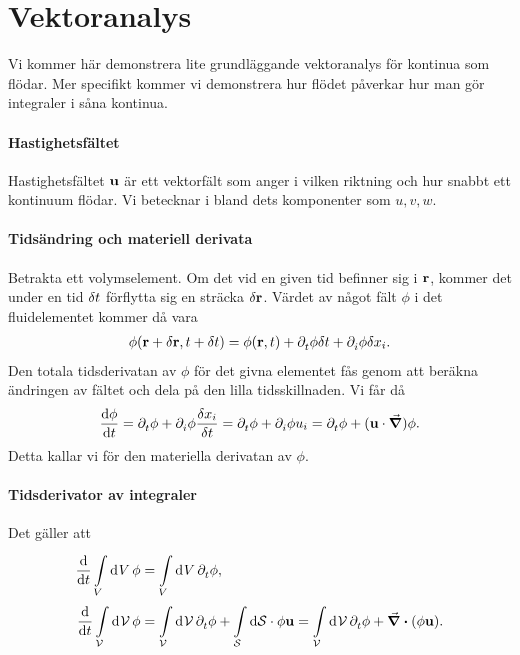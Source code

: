 \section{Vektoranalys}

Vi kommer här demonstrera lite grundläggande vektoranalys för kontinua som flödar. Mer specifikt kommer vi demonstrera hur flödet påverkar hur man gör integraler i såna kontinua.

\paragraph{Hastighetsfältet}
Hastighetsfältet $\vb{u}$ är ett vektorfält som anger i vilken riktning och hur snabbt ett kontinuum flödar. Vi betecknar i bland dets komponenter som $u, v, w$.

\paragraph{Tidsändring och materiell derivata}
Betrakta ett volymselement. Om det vid en given tid befinner sig i $\vb{r}$, kommer det under en tid $\delta t$ förflytta sig en sträcka $\delta \vb{r}$. Värdet av något fält $\phi$ i det fluidelementet kommer då vara
\begin{align*}
	\phi(\vb{r} + \delta \vb{r}, t + \delta t) = \phi(\vb{r}, t) + \partial_{t}^{}\phi\delta t + \partial_{i}^{}\phi\delta x_{i}.
\end{align*}
Den totala tidsderivatan av $\phi$ för det givna elementet fås genom att beräkna ändringen av fältet och dela på den lilla tidsskillnaden. Vi får då
\begin{align*}
	\dv{\phi}{t} = \partial_{t}^{}\phi + \partial_{i}^{}\phi\frac{\delta x_{i}}{\delta t} = \partial_{t}^{}\phi + \partial_{i}^{}\phi u_{i} = \partial_{t}^{}\phi + (\vb{u}\cdot\grad)\phi.
\end{align*}
Detta kallar vi för den materiella derivatan av $\phi$.

\paragraph{Tidsderivator av integraler}
Det gäller att
\begin{align*}
	\dv{t}\int\limits_{V}^{}\dd[]{V}\phi   &= \int\limits_{V}^{}\dd[]{V}\partial_{t}^{}\phi, \\
	\dv{t}\int\limits_{\mathcal{V}}^{}\dd[]{\mathcal{V}}\phi &= \int\limits_{\mathcal{V}}^{}\dd[]{\mathcal{V}}\partial_{t}^{}\phi + \int\limits_{\mathcal{S}}^{}\dd{\vb{\mathcal{S}}}\cdot \phi\vb{u} = \int\limits_{\mathcal{V}}^{}\dd[]{\mathcal{V}}\partial_{t}^{}\phi + \div(\phi\vb{u}).
\end{align*}